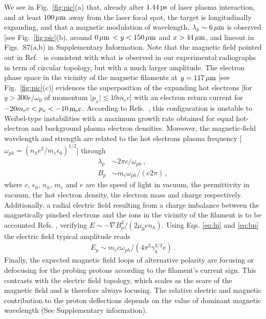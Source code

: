 \documentclass[aps,twocolumn,showpacs,superscriptaddress]{revtex4}
\begin{document}
We see in Fig.~\ref{fig:pic}(a) that, already after $1.44\,\rm ps$ of laser plasma interaction, and at least $100\,\rm \mu m$ away from the laser focal spot, the target is longitudinally  expanding, and that  a magnetic modulation  of wavelength, $\lambda_p \sim 6\,\rm\mu m$ is observed [see Fig.~\ref{fig:pic}(b), around $0\,\rm \mu m$ $<y<150\,\rm \mu m$ and $x>44\,\rm \mu m$, and lineout in Figs.~S7(a,b) in Supplementary Information.
 Note that the magnetic field  pointed out in Ref.~\cite{PRL_Gode_2017} is consistent with what is observed in our  experimental radiographs in term of circular topology, but with a much larger  amplitude. 
 The electron phase space in the vicinity of the magnetic filaments at $y = 117\,\rm \mu m$ [see Fig.~\ref{fig:pic}(c)] evidences the superposition of the expanding hot electrons [for  $y > 300c/\omega_0$ of momentum $\vert p_x \vert \lesssim 10 m_ec$] with an electron return current for $-20 m_ec < p_x< -10\,\rm m_e c$.
According to Refs.~\cite{POP_Ren_2006, PRL_Gode_2017}, 
this configuration  is unstable to Weibel-type instabilities with a maximum growth rate obtained for equal hot-electron and background plasma electron densities. Moreover, the magnetic-field wavelength and strength are related to the hot electrons plasma frequency [$\omega_{ph}=(n_h e^2/m_e \epsilon_0)^{1/2}$] through 
\begin{align}
 \lambda_p &\sim  2\pi c/\omega_{ph} \label{eq:lp}  \, ,\\
 B_p       &\sim m_e \omega_{ph}/(e2\pi) \label{eq:bp} \, , 
\end{align}
where $c$, $\epsilon_0$, $n_h$, $m_e$ and $e$  are the speed of light in vacuum, the permittivity in vacuum,  the hot electron density, the electron mass and  charge respectively.
Additionally, a radial electric field resulting from a charge imbalance between the magnetically pinched electrons and the ions in the vicinity of the filament is to be accounted Refs. \cite{POP_Dieckmann_2009, POP_Bret_Gremillet_2010}, verifying $E\sim   - \nabla B_p^2/(2 \mu_0e n_h)$. Using Eqs. \eqref{eq:lp} and \eqref{eq:bp} the electric field typical amplitude reads
\begin{align} 
E_p\sim m_ec\omega_{ph} /(4\pi^2\gamma_h^{3/2} e) \label{eq:ep} \, .
\end{align}
Finally, the expected magnetic field loops of alternative polarity are focusing or defocusing for the probing protons according to the filament's current sign. This contrasts with the electric field  topology, which scales as the scare of the magnetic field and is therefore always focusing. 
The relative electric and magnetic contribution to the proton deflections depends on the value of dominant magnetic wavelength (See Supplementary information). 
\end{document}
